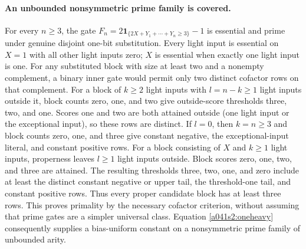 \paragraph{An unbounded nonsymmetric prime family is covered.}
For every $n\ge3$, the gate
$F_n=2\mathbf1_{\{2X+Y_1+\cdots+Y_n\ge3\}}-1$ is essential and
prime under genuine disjoint one-bit substitution. Every light input
is essential on $X=1$ with all other light inputs zero; $X$ is essential
when exactly one light input is one. For any substituted block with
size at least two and a nonempty complement, a binary inner gate
would permit only two distinct cofactor rows on that complement.
For a block of $k\ge2$ light inputs with $l=n-k\ge1$ light inputs
outside it, block counts zero, one, and two give outside-score
thresholds three, two, and one. Scores one and two are both attained
outside (one light input or the exceptional input), so these rows
are distinct. If $l=0$, then $k=n\ge3$ and block counts zero, one,
and three give constant negative, the exceptional-input literal,
and constant positive rows. For a block consisting of $X$ and
$k\ge1$ light inputs, properness leaves $l\ge1$ light inputs outside.
Block scores zero, one, two, and three are attained. The resulting
thresholds three, two, one, and zero include at least the distinct
constant negative or upper tail, the threshold-one tail, and constant
positive rows. Thus every proper candidate block has at least three
rows. This proves primality by the necessary cofactor criterion,
without assuming that prime gates are a simpler universal class.
Equation \eqref{a041s2:oneheavy} consequently supplies a bias-uniform
constant on a nonsymmetric prime family of unbounded arity.

